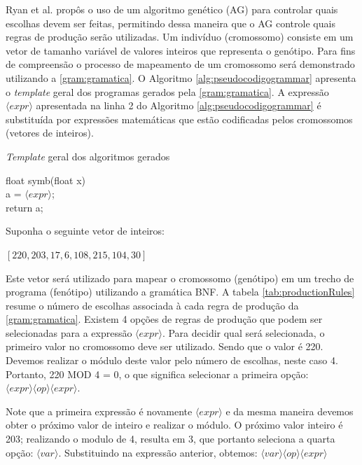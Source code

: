 Ryan et al. \cite{ryan1998grammatical}  propôs o uso de um algoritmo genético (AG) para controlar quais escolhas devem ser feitas, permitindo dessa maneira que o AG controle quais regras de produção serão utilizadas. Um indivíduo (cromossomo) consiste em um vetor de tamanho variável de valores inteiros que representa o genótipo. Para fins de compreensão o processo de mapeamento de um cromossomo será demonstrado utilizando a \autoref{gram:gramatica}. O Algoritmo \ref{alg:pseudocodigogrammar} apresenta o \textit{template} geral dos programas gerados pela \autoref{gram:gramatica}. A expressão $\langle expr \rangle$ apresentada na linha 2 do Algoritmo \ref{alg:pseudocodigogrammar} é substituída por expressões matemáticas que estão codificadas pelos cromossomos (vetores de inteiros). 

\begin{algorithm}
	\caption{\textit{Template} geral dos algoritmos gerados}
	\label{alg:pseudocodigogrammar}
	float symb(float x) { \\
		a = $\langle expr \rangle$;   \\
		return a;  \\
	}	
\end{algorithm}

\noindent
Suponha o seguinte vetor de inteiros:

\begin{center}
	$ [220, 203, 17, 6, 108, 215, 104, 30] $
\end{center}


Este vetor será utilizado para mapear o cromossomo (genótipo) em um trecho de programa (fenótipo) utilizando a gramática BNF. 
A tabela \autoref{tab:productionRules} resume o número de escolhas associada à cada regra de produção da \autoref{gram:gramatica}. Existem 4 opções de regras de produção que podem ser selecionadas para a expressão $ \langle expr \rangle$. Para decidir qual será selecionada, o primeiro valor no cromossomo deve ser utilizado. Sendo que o valor é 220. Devemos realizar o módulo deste valor pelo número de escolhas, neste caso 4. Portanto, 220 MOD 4 = 0, o que significa selecionar a primeira opção: $\langle expr \rangle \langle op \rangle \langle expr \rangle$.

Note que a primeira expressão é novamente $ \langle expr \rangle$ e da mesma maneira devemos obter o próximo valor de inteiro e realizar o módulo. O próximo valor inteiro é 203; realizando o modulo de 4, resulta em 3, que portanto seleciona a quarta opção: $ \langle var \rangle$. Substituindo na expressão anterior, obtemos: $ \langle var \rangle \langle op \rangle \langle expr \rangle$

